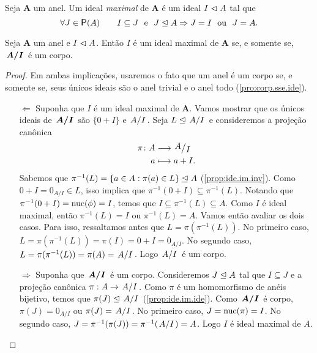 \begin{definition}
	Seja $\bm A$ um anel. Um ideal \emph{maximal} de $\bm A$ é um ideal $I \mathrel{\lhd} A$ tal que
	\begin{equation*}
	\forall J \in \p(A) \qquad I \subseteq J \e J \ide A \Rightarrow J = I \ou J = A.
	\end{equation*}
\end{definition}

\begin{theorem}
\label{teo:ide.max.cor}
	Seja $\bm A$ um anel e $I \mathrel{\lhd} A$. Então $I$ é um ideal maximal de $\bm A$ se, e somente se, $\bm{\quo{A}{I}}$ é um corpo.
\end{theorem}
\begin{proof} Em ambas implicações, usaremos o fato que um anel é um corpo se, e somente se, seus únicos ideais são o anel trivial e o anel todo (\ref{pro:corp.sse.ide}).
	\begin{enumerate}
	\item[$\Leftarrow$] Suponha que $I$ é um ideal maximal de $\bm A$.  Vamos mostrar que os únicos ideais de $\bm{\quo{A}{I}}$ são $\{0+I\}$ e $\quo{A}{I}$. Seja $L \ide \quo{A}{I}$ e consideremos a projeção canônica
	\begin{align*}
	\func{\pi}{A}{\quo{A}{I}}{a}{a+I.}
	\end{align*}
Sabemos que $\pi^{-1}(L)=\{a \in A : \pi(a) \in L\} \mathrel{\unlhd} A$ (\ref{prop:ide.im.inv}). Como $0+I=0_{A/I} \in L$, isso implica que $\pi^{-1}(0+I) \subseteq \pi^{-1}(L)$. Notando que $\pi^{-1}(0+I)=\operatorname{nuc}(\phi)=I$, temos que $I \subseteq \pi^{-1}(L) \subseteq A$. Como $I$ é ideal maximal, então $\pi^{-1}(L)=I$ ou $\pi^{-1}(L)=A$. Vamos então avaliar os dois casos. Para isso, ressaltamos antes que $L=\pi(\pi^{-1}(L))$. No primeiro caso, $L=\pi(\pi^{-1}(L))=\pi(I)=0+I=0_{A/I}$. No segundo caso, $L=\pi(\pi^{-1}(L))=\pi(A)=\quo{A}{I}$. Logo $\quo{A}{I}$ é um corpo.
	\item[$\Rightarrow$] Suponha que $\bm{\quo{A}{I}}$ é um corpo. Consideremos $J \mathrel{\unlhd} A$ tal que $I \subseteq J$ e a projeção canônica $\pi: A \to \quo{A}{I}$. Como $\pi$ é um homomorfismo de anéis bijetivo, temos que $\pi(J) \ide \quo{A}{I}$ (\ref{prop:ide.im.ide}). Como $\bm{\quo{A}{I}}$ é corpo, $\pi(J)={0_{A/I}}$ ou $\pi(J)=\quo{A}{I}$. No primeiro caso, $J=\operatorname{nuc}(\pi)=I$. No segundo caso, $J=\pi^{-1}(\pi(J))=\pi^{-1}(\quo{A}{I})=A$. Logo $I$ é ideal maximal de $A$.
	\qedhere
	\end{enumerate}
\end{proof}

